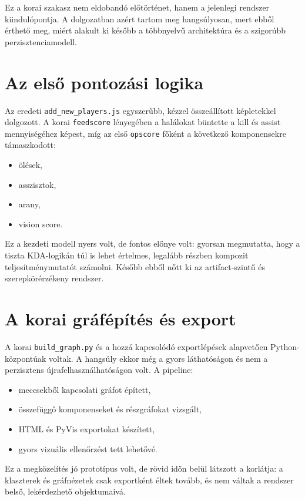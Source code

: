 ﻿\documentclass[a4paper,12pt]{report}
\begin{document}
Ez a korai szakasz nem eldobandó előtörténet, hanem a jelenlegi rendszer kiindulópontja. A dolgozatban azért tartom meg hangsúlyosan, mert ebből érthető meg, miért alakult ki később a többnyelvű architektúra és a szigorúbb perzisztenciamodell.

\section{Az első pontozási logika}

Az eredeti \texttt{add\_new\_players.js} egyszerűbb, kézzel összeállított képletekkel dolgozott. A korai \texttt{feedscore} lényegében a halálokat büntette a kill és assist mennyiségéhez képest, míg az első \texttt{opscore} főként a következő komponensekre támaszkodott:

\begin{itemize}
    \item ölések,
    \item asszisztok,
    \item arany,
    \item vision score.
\end{itemize}

Ez a kezdeti modell nyers volt, de fontos előnye volt: gyorsan megmutatta, hogy a tiszta KDA-logikán túl is lehet értelmes, legalább részben kompozit teljesítménymutatót számolni. Később ebből nőtt ki az artifact-szintű és szerepkörérzékeny rendszer.

\section{A korai gráfépítés és export}

A korai \texttt{build\_graph.py} és a hozzá kapcsolódó exportlépések alapvetően Python-központúak voltak. A hangsúly ekkor még a gyors láthatóságon és nem a perzisztens újrafelhasználhatóságon volt. A pipeline:

\begin{itemize}
    \item meccsekből kapcsolati gráfot épített,
    \item összefüggő komponenseket és részgráfokat vizsgált,
    \item HTML és PyVis exportokat készített,
    \item gyors vizuális ellenőrzést tett lehetővé.
\end{itemize}

Ez a megközelítés jó prototípus volt, de rövid időn belül látszott a korlátja: a klaszterek és gráfnézetek csak exportként éltek tovább, és nem váltak a rendszer belső, lekérdezhető objektumaivá.
\end{document}
